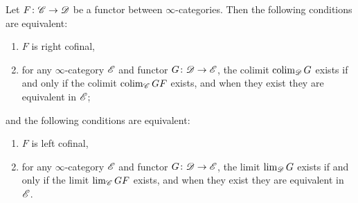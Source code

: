 \documentclass[../../thesis.tex]{subfiles}
\begin{document}
\begin{corollary}
    Let $F \colon \mathscr{C} \to \mathscr{D}$ be a functor between $\infty$-categories.
    Then the following conditions are equivalent:
    \begin{enumerate}
        \item $F$ is right cofinal,
        \item for any $\infty$-category $\mathscr{E}$ and functor $G\colon\mathscr{D}\to\mathscr{E}$, the colimit $\operatorname{colim}_{\mathscr{D}}G$ exists if and only if the colimit $\operatorname{colim}_{\mathscr{C}}GF$ exists, and when they exist they are equivalent in $\mathscr{E}$;
    \end{enumerate}
    and the following conditions are equivalent:
    \begin{enumerate}
        \item $F$ is left cofinal,
        \item for any $\infty$-category $\mathscr{E}$ and functor $G\colon\mathscr{D}\to\mathscr{E}$, the limit $\lim_{\mathscr{D}}G$ exists if and only if the limit $\lim_{\mathscr{C}}GF$ exists, and when they exist they are equivalent in $\mathscr{E}$.
    \end{enumerate}
\end{corollary}
\end{document}

